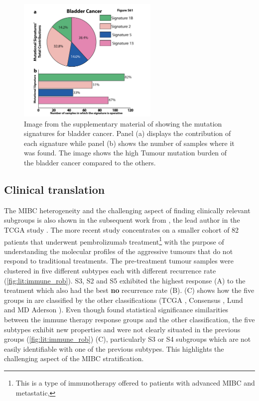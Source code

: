 \begin{figure}[!htb]    
    \centering
    \includegraphics[width=0.6\textwidth,height=0.6\textheight,keepaspectratio]{Sections/Lit_review/Resources/bladder_mut_sig.png}
    \caption{Image from the supplementary material of \cite{Alexandrov2013-gi} showing the mutation signatures for bladder cancer. Panel (a) displays the contribution of each signature while panel (b) shows the number of samples where it was found. The image shows the high Tumour mutation burden of the bladder cancer compared to the others.}
    \label{fig:lit:bladder_mut_sig}
\end{figure}



\subsection{Clinical translation} \label{s:lit:clinical}


The MIBC heterogeneity and the challenging aspect of finding clinically relevant subgroups is also shown in the subsequent work from \citet{Robertson2023-na}, the lead author in the TCGA study \cite{Robertson2017-mg}. The more recent study concentrates on a smaller cohort of 82 patients that underwent pembrolizumab treatment\footnote{This is a type of immunotherapy offered to patients with advanced MIBC and metastatic,} with the purpose of understanding the molecular profiles of the aggressive tumours that do not respond to traditional treatments. The pre-treatment tumour samples were clustered in five different subtypes each with different recurrence rate (\cref{fig:lit:immune_rob}). S3, S2 and S5 exhibited the highest response (A) to the treatment which also had the best \textbf{no} recurrence rate (B).  (C) shows how the five groups in \cite{Robertson2023-na} are classified by the other classifications (TCGA \cite{Robertson2017-mg}, Consensus \cite{Kamoun2020-tj}, Lund \cite{Marzouka2018-ge} and MD Aderson \cite{Dadhania2016-cb}). Even though \citet{Robertson2023-na} found statistical significance similarities between the immune therapy response groups and the other classification, the five subtypes exhibit new properties and were not clearly situated in the previous groups (\cref{fig:lit:immune_rob}) (C), particularly S3 or S4 subgroups which are not easily identifiable with one of the previous subtypes. This highlights the challenging aspect of the MIBC stratification.



